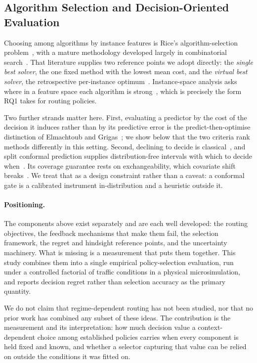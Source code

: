 \subsection{Algorithm Selection and Decision-Oriented Evaluation}

Choosing among algorithms by instance features is Rice's algorithm-selection
problem~\cite{rice1976}, with a mature methodology developed largely in
combinatorial search~\cite{xu2008satzilla,smithmiles2009,kotthoff2014survey}.
That literature supplies two reference points we adopt directly: the
\emph{single best solver}, the one fixed method with the lowest mean cost, and
the \emph{virtual best solver}, the retrospective per-instance
optimum~\cite{bischl2016aslib}. Instance-space analysis asks where in a feature
space each algorithm is strong~\cite{smithmiles2014instance}, which is
precisely the form RQ1 takes for routing policies.

Two further strands matter here. First, evaluating a predictor by the cost of
the decision it induces rather than by its predictive error is the
predict-then-optimise distinction of Elmachtoub and
Grigas~\cite{elmachtoub2022spo}; we show below that the two criteria rank
methods differently in this setting. Second, declining to decide is
classical~\cite{chow1970reject}, and split conformal prediction supplies
distribution-free intervals with which to decide when~\cite{vovk2005alrw,%
lei2018conformal}. Its coverage guarantee rests on exchangeability, which
covariate shift breaks~\cite{shimodaira2000,tibshirani2019covshift}. We treat
that as a design constraint rather than a caveat: a conformal gate is a
calibrated instrument in-distribution and a heuristic outside it.

\paragraph{Positioning.}
The components above exist separately and are each well developed: the routing
objectives, the feedback mechanisms that make them fail, the selection
framework, the regret and hindsight reference points, and the uncertainty
machinery. What is missing is a measurement that puts them together. This study
combines them into a single empirical policy-selection evaluation, run under a
controlled factorial of traffic conditions in a physical microsimulation, and
reports decision regret rather than selection accuracy as the primary quantity.

We do not claim that regime-dependent routing has not been studied, nor that no
prior work has combined any subset of these ideas. The contribution is the
measurement and its interpretation: how much decision value a context-dependent
choice among established policies carries when every component is held fixed and
known, and whether a selector capturing that value can be relied on outside the
conditions it was fitted on.

